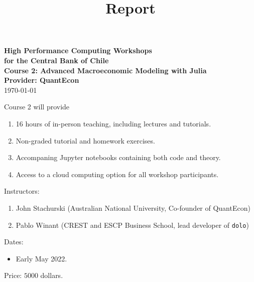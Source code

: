 \documentclass[12pt]{article}
\begin{document}
\title{Report}

\date{}


\begin{center}
    {\bf {\Large High Performance Computing Workshops \\
            for the Central Bank of Chile
    \\
    \vspace{1em}
    {\Large Course 2: Advanced Macroeconomic Modeling with Julia}
    \\
    \vspace{1em}
    Provider: QuantEcon \\
    }}
    \vspace{1em}
    \today
\end{center}


\vspace{.01in}







\thispagestyle{fancy}
Course 2 will provide 
%
\begin{enumerate}
    \item 16 hours of in-person teaching, including lectures and
        tutorials.
    \item Non-graded tutorial and homework exercises.
    \item Accompaning Jupyter notebooks containing both code and theory.
    \item Access to a cloud computing option for all workshop participants.
\end{enumerate}

Instructors:
%
\begin{enumerate}
    \item John Stachurski (Australian National University, Co-founder of QuantEcon)
    \item Pablo Winant (CREST and ESCP Business School, lead developer of \texttt{dolo})
\end{enumerate}

Dates: 
%
\begin{itemize}
    \item Early May 2022.
\end{itemize}

Price: $5000$ dollars.
\end{document}

